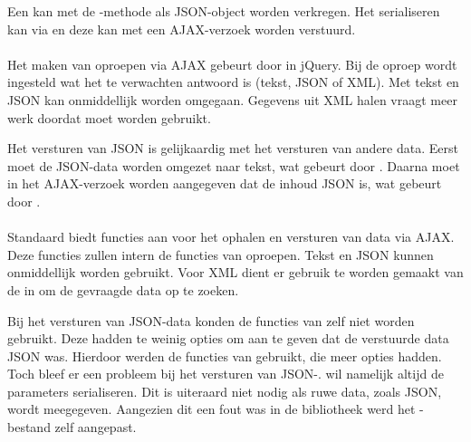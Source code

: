 Een  kan met de -methode als JSON-object worden verkregen.
Het serialiseren kan via  en deze kan met een AJAX-verzoek worden verstuurd.

\paragraph{\jqm}
Het maken van oproepen via AJAX gebeurt door  in jQuery. 
Bij de oproep wordt ingesteld wat het te verwachten antwoord is (tekst, JSON of XML). 
Met tekst en JSON kan onmiddellijk worden omgegaan.
Gegevens uit XML halen vraagt meer werk doordat  moet worden gebruikt.



Het versturen van JSON is gelijkaardig met het versturen van andere data.
Eerst moet de JSON-data worden omgezet naar tekst, wat gebeurt door .
Daarna moet in het AJAX-verzoek worden aangegeven dat de inhoud JSON is, wat gebeurt door .

\paragraph{\lungo}
Standaard biedt \lungo{} functies aan voor het ophalen en versturen van data via AJAX.
Deze functies zullen intern de functies van \quo{} oproepen.
Tekst en JSON kunnen onmiddellijk worden gebruikt.
Voor XML dient er gebruik te worden gemaakt van de  in \quo{} om de gevraagde data op te zoeken.

Bij het versturen van JSON-data konden de functies van \lungo{} zelf niet worden gebruikt.
Deze hadden te weinig opties om aan te geven dat de verstuurde data JSON was.
Hierdoor werden de functies van \quo{} gebruikt, die meer opties hadden.
Toch bleef er een probleem bij het versturen van JSON-.
\quo{} wil namelijk altijd de parameters serialiseren.
Dit is uiteraard niet nodig als ruwe data, zoals JSON, wordt meegegeven.
Aangezien dit een fout was in de bibliotheek werd het \js-bestand zelf aangepast.

